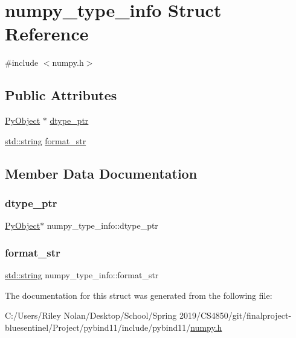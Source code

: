 \hypertarget{structnumpy__type__info}{}\section{numpy\+\_\+type\+\_\+info Struct Reference}
\label{structnumpy__type__info}


{\ttfamily \#include $<$numpy.\+h$>$}

\subsection*{Public Attributes}
\begin{DoxyCompactItemize}
\item 
\mbox{\hyperlink{_python27_2object_8h_aadc84ac7aed2cfa6f20c25f62bf3dac7}{Py\+Object}} $\ast$ \mbox{\hyperlink{structnumpy__type__info_ad46eb783dd69c5a6d8e8bfa187080621}{dtype\+\_\+ptr}}
\item 
\mbox{\hyperlink{_s_d_l__opengl__glext_8h_ab4ccfaa8ab0e1afaae94dc96ef52dde1}{std\+::string}} \mbox{\hyperlink{structnumpy__type__info_aeabd460f2da4bbe16f683b6f302781b1}{format\+\_\+str}}
\end{DoxyCompactItemize}


\subsection{Member Data Documentation}
\mbox{\label{structnumpy__type__info_ad46eb783dd69c5a6d8e8bfa187080621}} 
\subsubsection{\texorpdfstring{dtype\_ptr}{dtype\_ptr}}
{\footnotesize\ttfamily \mbox{\hyperlink{_python27_2object_8h_aadc84ac7aed2cfa6f20c25f62bf3dac7}{Py\+Object}}$\ast$ numpy\+\_\+type\+\_\+info\+::dtype\+\_\+ptr}

\mbox{\label{structnumpy__type__info_aeabd460f2da4bbe16f683b6f302781b1}} 
\subsubsection{\texorpdfstring{format\_str}{format\_str}}
{\footnotesize\ttfamily \mbox{\hyperlink{_s_d_l__opengl__glext_8h_ab4ccfaa8ab0e1afaae94dc96ef52dde1}{std\+::string}} numpy\+\_\+type\+\_\+info\+::format\+\_\+str}



The documentation for this struct was generated from the following file\+:\begin{DoxyCompactItemize}
\item 
C\+:/\+Users/\+Riley Nolan/\+Desktop/\+School/\+Spring 2019/\+C\+S4850/git/finalproject-\/bluesentinel/\+Project/pybind11/include/pybind11/\mbox{\hyperlink{numpy_8h}{numpy.\+h}}\end{DoxyCompactItemize}
